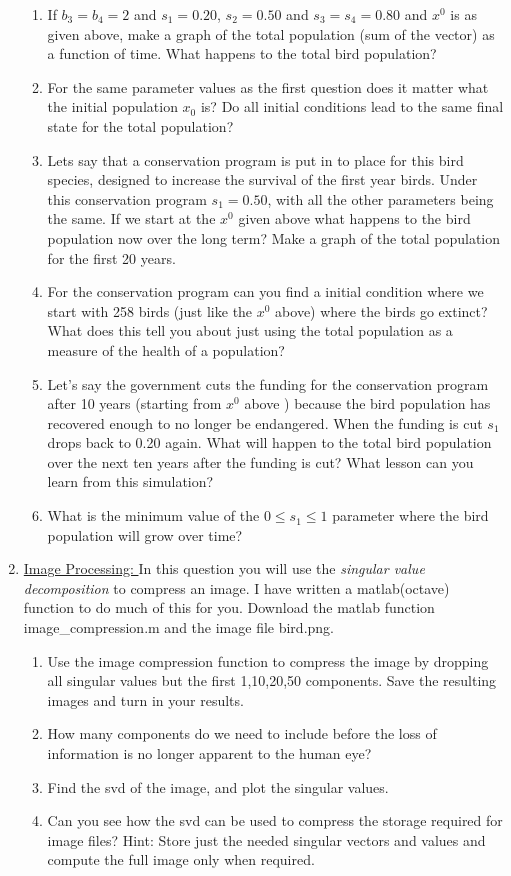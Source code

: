 \documentclass[11pt, a4paper]{article}
\begin{document}
\begin{enumerate}
\begin{enumerate}
\item If $b_3=b_4=2$ and $s_1=0.20$, $s_2=0.50$ and $s_3=s_4=0.80$ and $x^0$ is as given above, make a graph of the total population (sum of the vector) as a function of time. What happens to the total bird population? 
\item For the same parameter values as the first question does it matter what the initial population $x_0$ is? Do all initial conditions lead to the same final state for the total population?
\item Lets say that a conservation program is put in to place for this bird species, designed to increase the survival of the first year birds. Under this conservation program $s_1=0.50$, with all the other parameters being the same. If we start at the $x^0$ given above what happens to the bird population now over the long term? Make a graph of the total population for the first 20 years.
\item For the conservation program can you find a initial condition where we start with 258 birds (just like the $x^0$ above) where the birds go extinct? What does this tell you about just using the total population as a measure of the health of a population?
\item Let's say the government cuts the funding for the conservation program after 10 years (starting from $x^0$ above ) because the bird population has recovered enough to no longer be endangered. When the funding is cut $s_1$ drops back to 0.20 again. What will happen to the total bird population over the next ten years after the funding is cut? What lesson can you learn from this simulation? 
\item What is the minimum value of the $0 \leq s_1 \leq 1$ parameter where the bird population will grow over time? 
\end{enumerate}

\item \underline{Image Processing: } 
In this question you will use the \textit{singular value decomposition} to compress an image. I have written a matlab(octave) function to do much of this for you. Download the matlab function image\_compression.m and the image file bird.png. 
\begin{enumerate}
\item Use the image compression function to compress the image by dropping all singular values but the first 1,10,20,50 components. Save the resulting images and turn in your results. 
\item How many components do we need to include before the loss of information is no longer apparent to the human eye?
\item Find the svd of the image, and plot the singular values. 
\item Can you see how the svd can be used to compress the storage required for image files? Hint: Store just the needed singular vectors and values and compute the full image only when required. 
\end{enumerate}



\end{enumerate}
\end{document}
